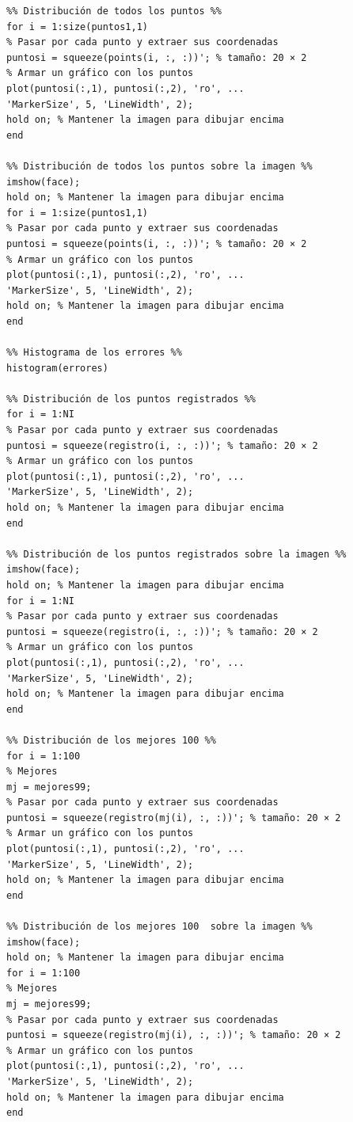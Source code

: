 \documentclass[11pt, letterpaper]{article}
\begin{document}
\begin{verbatim}
%% Distribución de todos los puntos %%
for i = 1:size(puntos1,1)
% Pasar por cada punto y extraer sus coordenadas
puntosi = squeeze(points(i, :, :))'; % tamaño: 20 × 2
% Armar un gráfico con los puntos 
plot(puntosi(:,1), puntosi(:,2), 'ro', ...
'MarkerSize', 5, 'LineWidth', 2);
hold on; % Mantener la imagen para dibujar encima
end

%% Distribución de todos los puntos sobre la imagen %%
imshow(face);
hold on; % Mantener la imagen para dibujar encima
for i = 1:size(puntos1,1)
% Pasar por cada punto y extraer sus coordenadas
puntosi = squeeze(points(i, :, :))'; % tamaño: 20 × 2
% Armar un gráfico con los puntos 
plot(puntosi(:,1), puntosi(:,2), 'ro', ...
'MarkerSize', 5, 'LineWidth', 2);
hold on; % Mantener la imagen para dibujar encima
end

%% Histograma de los errores %%
histogram(errores)

%% Distribución de los puntos registrados %%
for i = 1:NI
% Pasar por cada punto y extraer sus coordenadas
puntosi = squeeze(registro(i, :, :))'; % tamaño: 20 × 2
% Armar un gráfico con los puntos 
plot(puntosi(:,1), puntosi(:,2), 'ro', ...
'MarkerSize', 5, 'LineWidth', 2);
hold on; % Mantener la imagen para dibujar encima
end

%% Distribución de los puntos registrados sobre la imagen %%
imshow(face);
hold on; % Mantener la imagen para dibujar encima
for i = 1:NI
% Pasar por cada punto y extraer sus coordenadas
puntosi = squeeze(registro(i, :, :))'; % tamaño: 20 × 2
% Armar un gráfico con los puntos 
plot(puntosi(:,1), puntosi(:,2), 'ro', ...
'MarkerSize', 5, 'LineWidth', 2);
hold on; % Mantener la imagen para dibujar encima
end

%% Distribución de los mejores 100 %%
for i = 1:100
% Mejores
mj = mejores99;
% Pasar por cada punto y extraer sus coordenadas
puntosi = squeeze(registro(mj(i), :, :))'; % tamaño: 20 × 2
% Armar un gráfico con los puntos 
plot(puntosi(:,1), puntosi(:,2), 'ro', ...
'MarkerSize', 5, 'LineWidth', 2);
hold on; % Mantener la imagen para dibujar encima
end

%% Distribución de los mejores 100  sobre la imagen %%
imshow(face);
hold on; % Mantener la imagen para dibujar encima
for i = 1:100
% Mejores
mj = mejores99;
% Pasar por cada punto y extraer sus coordenadas
puntosi = squeeze(registro(mj(i), :, :))'; % tamaño: 20 × 2
% Armar un gráfico con los puntos 
plot(puntosi(:,1), puntosi(:,2), 'ro', ...
'MarkerSize', 5, 'LineWidth', 2);
hold on; % Mantener la imagen para dibujar encima
end
\end{verbatim}
	
	
	
	
\end{document}
